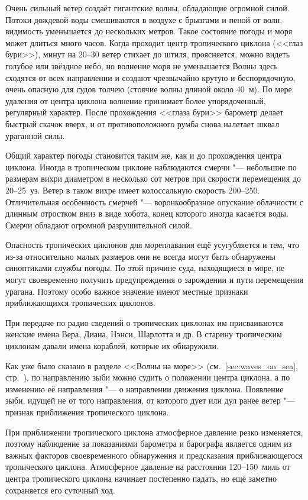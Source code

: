 Очень сильный ветер создаёт гигантские волны, обладающие огромной
силой. Потоки дождевой воды смешиваются в воздухе с брызгами и пеной
от волн, видимость уменьшается до нескольких метров. Такое состояние
погоды и моря может длиться много часов. Когда проходит центр
тропического циклона (<<глаз бури>>), минут на 20--30 ветер стихает до
штиля, проясняется, можно видеть голубое или звёздное небо, но
волнение моря не уменьшается Волны здесь сходятся от всех направлении
и создают чрезвычайно крутую и беспорядочную, очень опасную для судов
толчею (стоячие волны длиной около 40~м). По мере удаления от центра
циклона волнение принимает более упорядоченный, регулярный
характер. После прохождения <<глаза бури>> барометр делает быстрый
скачок вверх, и от противоположного румба снова налетает шквал
ураганной силы.

Общий характер погоды становится таким же, как и до прохождения центра
циклона. Иногда в тропическом циклоне наблюдаются смерчи "--- небольшие
по размерам вихри диаметром в несколько сот метров при скорости
перемещения до 20--25~уз. Ветер в таком вихре имеет колоссальную
скорость 200--250\speedms. Отличительная особенность смерчей "---
воронкообразное опускание облачности с длинным отростком вниз в виде
хобота, конец которого иногда касается воды. Смерчи обладают огромной
разрушительной силой.

Опасность тропических циклонов для мореплавания ещё усугубляется и
тем, что из-за относительно малых размеров они не всегда могут быть
обнаружены синоптиками службы погоды. По этой причине суда,
находящиеся в море, не могут своевременно получить предупреждения о
зарождении и пути перемещения урагана. Поэтому особо важное значение
имеют местные признаки приближающихся тропических циклонов.

При передаче по радио сведений о тропических циклонах им присваиваются
женские имена Вера, Диана, Нэнси, Шарлотта и др. В старину тропическим
циклонам давали имена кораблей, которые их обнаружили.

 Как уже было сказано в разделе <<Волны на море>>
(см.~\ref{sec:waves_on_sea}, стр.~\pageref{sec:waves_on_sea}), по
направлению зыби можно судить о положении центра циклона, а по
изменению её направления "--- о направлении движения
циклона. Появление зыби, идущей не от того направления, от которого
дует или дул ранее ветер "--- признак приближения тропического
циклона.

 При приближении тропического циклона атмосферное давление
резко изменяется, поэтому наблюдение за показаниями барометра и
барографа является одним из важных факторов своевременного обнаружения
и предсказания приближающегося тропического циклона. Атмосферное
давление на расстоянии 120--150~миль от центра тропического циклона
начинает постепенно падать, но ещё заметно сохраняется его суточный
ход.

